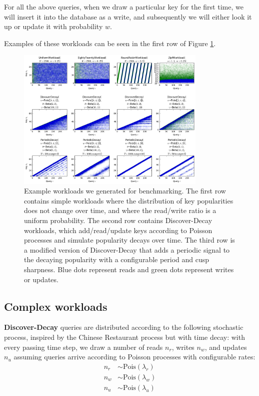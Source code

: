 \documentclass{sig-alternate-05-2015}
\begin{document}
For all the above queries, when we draw a particular key for the first time, we
will insert it into the database as a write, and subsequently we will either
look it up or update it with probability $w$.

Examples of these workloads can be seen in the first row of Figure
\ref{fig:workloads}.

\begin{figure}[!htb]
\begin{center}
\includegraphics[width=0.81\textwidth]{workloads.png}
\end{center}
\caption{Example workloads we generated for benchmarking. The first row
  contains simple workloads where the distribution of key popularities does not
  change over time, and where the read/write ratio is a uniform probability.
  The second row contains Discover-Decay workloads, which add/read/update keys
  according to Poisson processes and simulate popularity decays over time. The
  third row is a modified version of Discover-Decay that adds a periodic signal
  to the decaying popularity with a configurable period and cusp sharpness. Blue
  dots represent reads and green dots represent writes or updates.}
\label{fig:workloads}
\end{figure}

\subsection{Complex workloads}

\textbf{Discover-Decay} queries are distributed according to the following
stochastic process, inspired by the Chinese Restaurant process \cite{crp} but
with time decay: with every passing time step, we draw a number of reads $n_r$,
writes $n_w$, and updates $n_u$ assuming queries arrive according to Poisson
processes with configurable rates: \[
\begin{split}
  n_r & \sim \textrm{Pois}(\lambda_r) \\
  n_w & \sim \textrm{Pois}(\lambda_w) \\
  n_u & \sim \textrm{Pois}(\lambda_u)
\end{split}
\]
\end{document}
